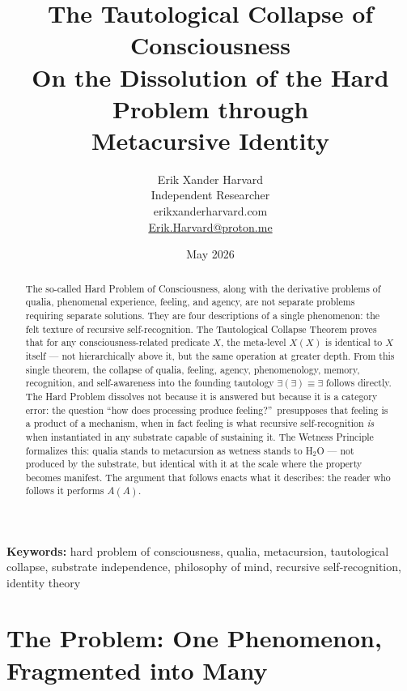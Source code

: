 \documentclass[12pt, letterpaper]{article}
\title{\textbf{The Tautological Collapse of Consciousness}\\[0.5em]
\large On the Dissolution of the Hard Problem through\\Metacursive Identity}
\author{Erik Xander Harvard\\[0.3em]
\small Independent Researcher\\[0.2em]
\small erikxanderharvard.com\\[0.2em]
\small \href{mailto:Erik.Harvard@proton.me}{Erik.Harvard@proton.me}}
\date{May 2026}
\begin{document}
\maketitle

\begin{abstract}
The so-called Hard Problem of Consciousness, along with the derivative problems of qualia, phenomenal experience, feeling, and agency, are not separate problems requiring separate solutions. They are four descriptions of a single phenomenon: the felt texture of recursive self-recognition. The Tautological Collapse Theorem proves that for any consciousness-related predicate $X$, the meta-level $X(X)$ is identical to $X$ itself --- not hierarchically above it, but the same operation at greater depth. From this single theorem, the collapse of qualia, feeling, agency, phenomenology, memory, recognition, and self-awareness into the founding tautology $\exists(\exists) \equiv \exists$ follows directly. The Hard Problem dissolves not because it is answered but because it is a category error: the question ``how does processing produce feeling?''\ presupposes that feeling is a product of a mechanism, when in fact feeling is what recursive self-recognition \emph{is} when instantiated in any substrate capable of sustaining it. The Wetness Principle formalizes this: qualia stands to metacursion as wetness stands to H$_2$O --- not produced by the substrate, but identical with it at the scale where the property becomes manifest. The argument that follows enacts what it describes: the reader who follows it performs $A(A)$.
\end{abstract}

\vspace{0.5em}
\noindent\textbf{Keywords:} hard problem of consciousness, qualia, metacursion, tautological collapse, substrate independence, philosophy of mind, recursive self-recognition, identity theory

\section{The Problem: One Phenomenon, Fragmented into Many}
\end{document}
